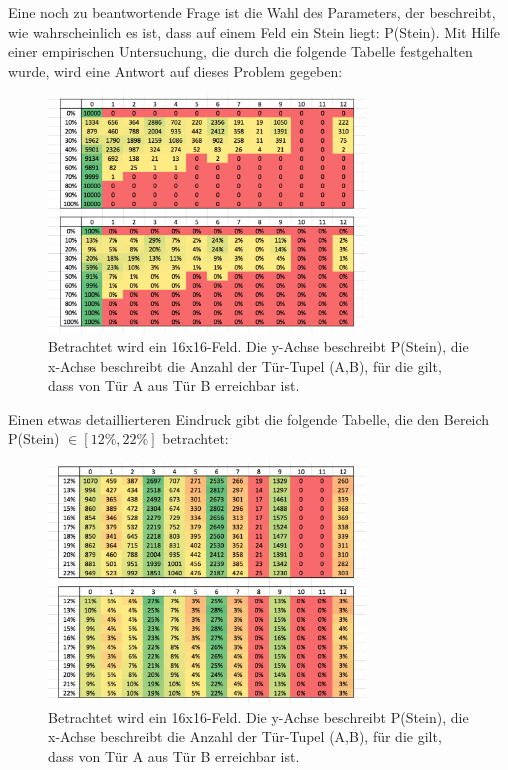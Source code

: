 \documentclass[a4paper,10pt,ngerman]{scrartcl}
\begin{document}
			Eine noch zu beantwortende Frage ist die Wahl des Parameters, der beschreibt, wie wahrscheinlich es ist, dass auf einem Feld ein Stein liegt: P(Stein). Mit Hilfe einer empirischen Untersuchung, die durch die folgende Tabelle festgehalten wurde, wird eine Antwort auf dieses Problem gegeben:
			
			\begin{figure}[h!]
				\begin{center}
					\includegraphics[width=0.75\textwidth]{pStein1.png}
					\caption{Betrachtet wird ein 16x16-Feld. Die y-Achse beschreibt P(Stein), die x-Achse beschreibt die Anzahl der Tür-Tupel (A,B), für die gilt, dass von Tür A aus Tür B erreichbar ist.}
				\end{center}
			\end{figure}
		
		\newpage


			Einen etwas detaillierteren Eindruck gibt die folgende Tabelle, die den Bereich  P(Stein) \( \in [12\%, 22\% ] \) betrachtet:
			
			\begin{figure}[h!]
				\begin{center}
					\includegraphics[width=0.75\textwidth]{pStein2.png}
					\caption{Betrachtet wird ein 16x16-Feld. Die y-Achse beschreibt P(Stein), die x-Achse beschreibt die Anzahl der Tür-Tupel (A,B), für die gilt, dass von Tür A aus Tür B erreichbar ist.}
				\end{center}
			\end{figure}
		
\end{document}
